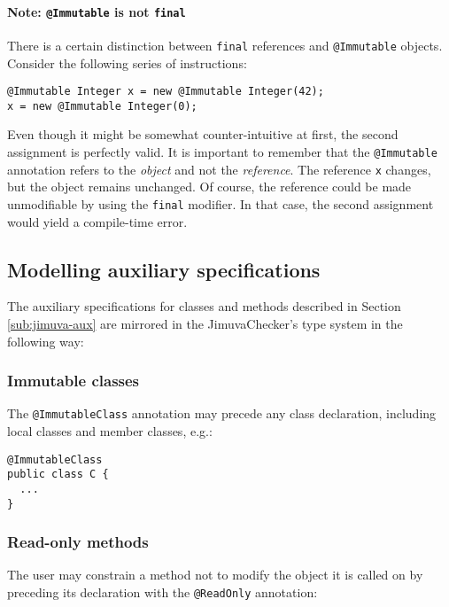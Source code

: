 \documentclass{pracamgr}
\theoremstyle{all}
\begin{document}
\paragraph{Note: \texttt{@Immutable} is not \texttt{final}} $\,$ \\

There is a certain distinction between \texttt{final} references and
\texttt{@Immutable} objects. Consider the following series of
instructions:
\begin{lstlisting}
@Immutable Integer x = new @Immutable Integer(42);
x = new @Immutable Integer(0);
\end{lstlisting}
Even though it might be somewhat counter-intuitive at first, the
second assignment is perfectly valid. It is important to remember that
the \texttt{@Immutable} annotation refers to the \emph{object} and not
the \emph{reference}. The reference \texttt{x} changes, but the object
remains unchanged. Of course, the reference could be made unmodifiable
by using the \texttt{final} modifier. In that case, the second
assignment would yield a compile-time error.

\subsection{Modelling auxiliary specifications}

The auxiliary specifications for classes and methods described in
Section \ref{sub:jimuva-aux} are mirrored in the JimuvaChecker's type
system in the following way: 

\subsubsection{Immutable classes}

The \texttt{@ImmutableClass} annotation may precede any class
declaration, including local classes and member classes, e.g.:

\begin{lstlisting}
@ImmutableClass
public class C {
  ...
}
\end{lstlisting}

\subsubsection{Read-only methods}

The user may constrain a method not to modify the object it is called
on by preceding its declaration with the \texttt{@ReadOnly} annotation:
\end{document}
